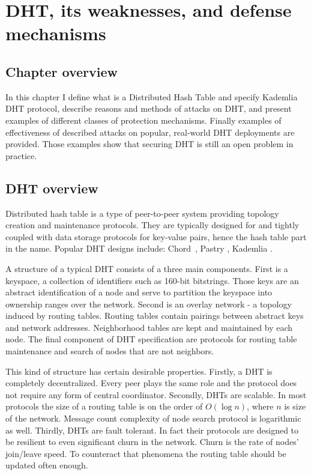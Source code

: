 \chapter{DHT, its weaknesses, and defense mechanisms}
\section{Chapter overview}
  In this chapter I define what is a Distributed Hash Table and specify Kademlia
  DHT protocol, describe reasons and methods of attacks on DHT, and present
  examples of different classes of protection mechanisms. Finally examples of
  effectiveness of described attacks on popular, real-world DHT deployments are
  provided. Those examples show that securing DHT is still an open problem in
  practice.

\section{DHT overview}

  Distributed hash table is a type of peer-to-peer system providing topology
  creation and maintenance protocols. They are typically designed for and
  tightly coupled with data storage protocols for key-value pairs, hence the
  hash table part in the name. Popular DHT designs include: Chord~\cite{sto03},
  Pastry \cite{row01}, Kademlia \cite{may02}.

  A structure of a typical DHT consists of a three main components. First is a
  keyspace, a collection of identifiers such as 160-bit bitstrings. Those keys
  are an abstract identification of a node and serve to partition the keyspace
  into ownership ranges over the network. Second is an overlay network - a
  topology induced by routing tables. Routing tables contain pairings between
  abstract keys and network addresses. Neighborhood tables are kept and
  maintained by each node. The final component of DHT specification are
  protocols for routing table maintenance and search of nodes that are not
  neighbors.

  This kind of structure has certain desirable properties. Firstly, a DHT is
  completely decentralized. Every peer plays the same role and the protocol does
  not require any form of central coordinator. Secondly, DHTs are scalable. In
  most protocols the size of a routing table is on the order of $O(\log n)$,
  where $n$ is size of the network. Message count complexity of node search
  protocol is logarithmic as well. Thirdly, DHTs are fault tolerant. In fact
  their protocols are designed to be resilient to even significant churn in the
  network. Churn is the rate of nodes' join/leave speed. To counteract that
  phenomena the routing table should be updated often enough.
 
